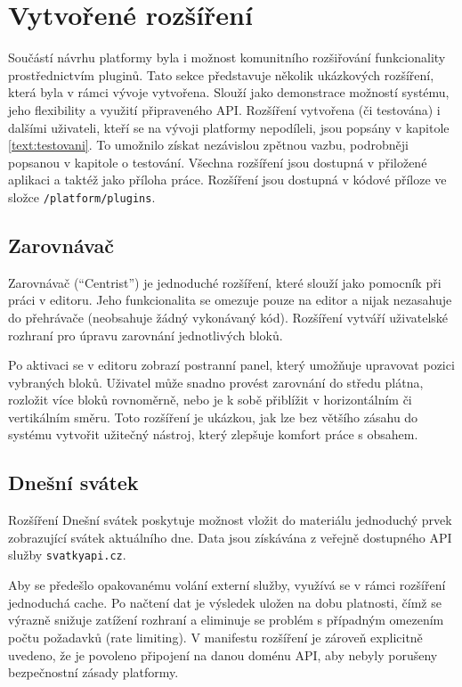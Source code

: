 \section{Vytvořené rozšíření}\label{text:realizace/vytvoreneRozsireni}

Součástí návrhu platformy byla i možnost komunitního rozšiřování funkcionality prostřednictvím pluginů. 
Tato sekce představuje několik ukázkových rozšíření, která byla v rámci vývoje vytvořena. 
Slouží jako demonstrace možností systému, jeho flexibility a využití připraveného API. 
Rozšíření vytvořena (či testována) i dalšími uživateli, kteří se na vývoji platformy nepodíleli, jsou popsány v kapitole \ref{text:testovani}.
To umožnilo získat nezávislou zpětnou vazbu, podrobněji popsanou v kapitole o testování. Všechna rozšíření jsou dostupná v přiložené aplikaci a taktéž jako příloha práce.
Rozšíření jsou dostupná v kódové příloze ve složce \verb|/platform/plugins|.

\subsection{Zarovnávač}

Zarovnávač (\enquote{Centrist}) je jednoduché rozšíření, které slouží jako pomocník při práci v editoru.
Jeho funkcionalita se omezuje pouze na editor a nijak nezasahuje do přehrávače (neobsahuje žádný vykonávaný kód).
Rozšíření vytváří uživatelské rozhraní pro úpravu zarovnání jednotlivých bloků.

Po aktivaci se v editoru zobrazí postranní panel, který umožňuje upravovat pozici vybraných bloků. 
Uživatel může snadno provést zarovnání do středu plátna, rozložit více bloků rovnoměrně, nebo je k sobě přiblížit v horizontálním či vertikálním směru. 
Toto rozšíření je ukázkou, jak lze bez většího zásahu do systému vytvořit užitečný nástroj, který zlepšuje komfort práce s obsahem.

\subsection{Dnešní svátek}

Rozšíření Dnešní svátek poskytuje možnost vložit do materiálu jednoduchý prvek zobrazující svátek aktuálního dne. 
Data jsou získávána z veřejně dostupného API služby \texttt{svatkyapi.cz}.

Aby se předešlo opakovanému volání externí služby, využívá se v rámci rozšíření jednoduchá cache. 
Po načtení dat je výsledek uložen na dobu platnosti, čímž se výrazně snižuje zatížení rozhraní a eliminuje se problém s případným omezením počtu požadavků (rate limiting).
V manifestu rozšíření je zároveň explicitně uvedeno, že je povoleno připojení na danou doménu API, aby nebyly porušeny bezpečnostní zásady platformy.

